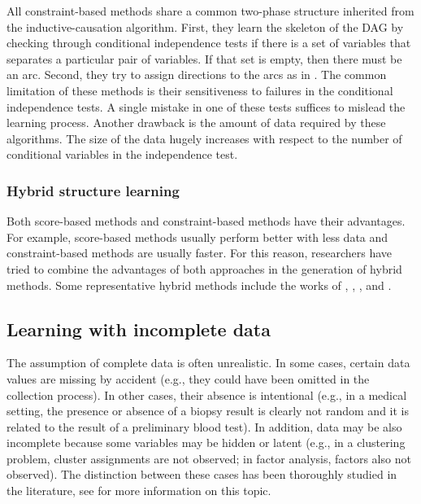 All constraint-based methods share a common two-phase structure inherited from the inductive-causation algorithm. First, they learn the skeleton of the DAG by checking through conditional independence tests if there is a set of variables that separates a particular pair of variables. If that set is empty, then there must be an arc. Second, they try to assign directions to the arcs as in \cite{meek1995}. The common limitation of these methods is their sensitiveness to failures in the conditional independence tests. A single mistake in one of these tests suffices to mislead the learning process. Another drawback is the amount of data required by these algorithms. The size of the data hugely increases with respect to the number of conditional variables in the independence test. 

\subsubsection{Hybrid structure learning}
Both score-based methods and constraint-based methods have their advantages. For example, score-based methods usually perform better with less data and constraint-based methods are usually faster. For this reason, researchers have tried to combine the advantages of both approaches in the generation of hybrid methods. Some representative hybrid methods include the works of \cite{singh1993,singh1995}, \cite{dash1999}, \cite{decampos2003}, and \cite{tsamardinos2006}.


\subsection{Learning with incomplete data}
\label{sec:2_learning_with_incomplete_data}

The assumption of complete data is often unrealistic. In some cases, certain data values are missing by accident (e.g., they could have been omitted in the collection process). In other cases, their absence is intentional (e.g., in a medical setting, the presence or absence of a biopsy result is clearly not random and it is related to the result of a preliminary blood test). In addition, data may be also incomplete because some variables may be hidden or latent (e.g., in a clustering problem, cluster assignments are not observed; in factor analysis, factors also not observed). The distinction between these cases has been thoroughly studied in the literature, see \cite{little1987} for more information on this topic.

